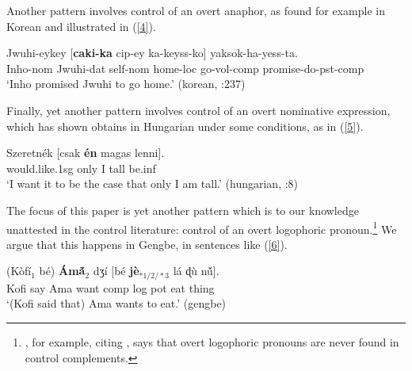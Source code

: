 \documentclass[output=paper
,modfonts
,nonflat]{langsci/langscibook}
\newcommand{\Z}{ʒ}
\newcommand{\D}{ɖ}
\newcommand{\á}{\'{ã}}
\newcommand{\É}{\'{\~{ε}}}
\newcommand{\È}{\`{\~{ε}}}
\newcommand{\í}{\'{\~{i}}}
\newcommand{\ì}{\`{\~{i}}}
\newcommand{\Ó}{\'{\~{ɔ}}}
\newcommand{\Ò}{\`{\~{ɔ}}}
\newcommand{\ú}{\'{ũ}}
\newcommand{\ù}{\`{ũ}}
\begin{document}
 \nocite{lee03}

Another pattern involves control of an overt anaphor, as found for example in Korean and illustrated in (\ref{4}).


\ea
{} Jwuhi-eykey [{\bf caki-ka} cip-ey ka-keyss-ko] yaksok-ha-yess-ta.\\
Inho-{\sc nom} Jwuhi-{\sc dat} self-{\sc nom} home-{\sc loc} go-{\sc vol}-{\sc comp} promise-do-{\sc pst}-{\sc comp}\\
\glt `Inho promised Jwuhi to go home.' \hfill({\sc korean}, \citealt{madigan08a}:237) \label{4}
\z

Finally, yet another pattern involves control of an overt nominative expression, which \cite{szabolcsi09} has shown obtains in Hungarian under some conditions, as in (\ref{5}).

\ea
\gll Szeretn\'ek [csak {\bf \'en}  magas lenni].\\
would.like.1{\sc sg} only I  tall be.{\sc inf}\\
\glt `I want it to be the case that only I am tall.' \hfill({\sc hungarian}, \citealt{szabolcsi09}:8) \label{5}
\z

The focus of this paper is yet another pattern which is to our knowledge unattested in the control literature: control of an overt logophoric pronoun.\footnote{\cite{landau15}, for example, citing \cite{culy94}, says that overt logophoric pronouns are never found in control complements.}
 We argue that this happens in Gengbe, in sentences like (\ref{6}).

\ea
\gll (K\`of\'i$_{1}$ b\'e) {\bf \'Am\'{\~a}$_{2}$}  d{\Z}\'i [b\'e {\bf j\`e$_{*1/2/*3}$}  l\'a {\D}\`u n{\ú}].\\
Kofi say Ama want {\sc comp} {\sc log} {\sc pot} eat thing\\
\glt `(Kofi said that) Ama wants to eat.' \label{wll} \hfill ({\sc gengbe}) \label{6}
\z

\end{document}
